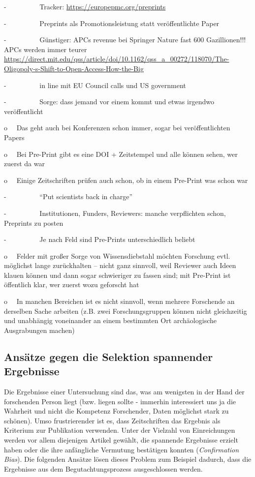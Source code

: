 \documentclass[
  letterpaper,
  DIV=11,
  numbers=noendperiod]{scrreprt}
\begin{document}
-~~~~~~~~~ Tracker: \url{https://europepmc.org/preprints}

-~~~~~~~~~ Preprints als Promotionsleistung statt veröffentlichte Paper

-~~~~~~~~~ Günstiger: APCs revenue bei Springer Nature fast 600
Gazillionen!!! APCs werden immer teurer
\url{https://direct.mit.edu/qss/article/doi/10.1162/qss_a_00272/118070/The-Oligopoly-s-Shift-to-Open-Access-How-the-Big}

-~~~~~~~~~ in line mit EU Council calls und US government

-~~~~~~~~~ Sorge: dass jemand vor einem kommt und etwas irgendwo
veröffentlicht

o~~ Das geht auch bei Konferenzen schon immer, sogar bei
veröffentlichten Papers

o~~ Bei Pre-Print gibt es eine DOI + Zeitstempel und alle können sehen,
wer zuerst da war

o~~ Einige Zeitschriften prüfen auch schon, ob in einem Pre-Print was
schon war

-~~~~~~~~~ ``Put scientists back in charge''

-~~~~~~~~~ Institutionen, Funders, Reviewers: manche verpflichten schon,
Preprints zu posten

-~~~~~~~~~ Je nach Feld sind Pre-Prints unterschiedlich beliebt

o~~ Felder mit großer Sorge von Wissensdiebstahl möchten Forschung evtl.
möglichst lange zurückhalten -- nicht ganz sinnvoll, weil Reviewer auch
Ideen klauen können und dann sogar schwieriger zu fassen sind; mit
Pre-Print ist öffentlich klar, wer zuerst wozu geforscht hat

o~~ In manchen Bereichen ist es nicht sinnvoll, wenn mehrere Forschende
an derselben Sache arbeiten (z.B. zwei Forschungsgruppen können nicht
gleichzeitig und unabhängig voneinander an einem bestimmten Ort
archäologische Ausgrabungen machen)

\subsection{Ansätze gegen die Selektion spannender
Ergebnisse}\label{ansuxe4tze-gegen-die-selektion-spannender-ergebnisse}

Die Ergebnisse einer Untersuchung sind das, was am wenigsten in der Hand
der forschenden Person liegt (bzw. liegen sollte - immerhin interessiert
uns ja die Wahrheit und nicht die Kompetenz Forschender, Daten möglichst
stark zu schönen). Umso frustrierender ist es, dass Zeitschriften das
Ergebnis als Kriterium zur Publikation verwenden. Unter der Vielzahl von
Einreichungen werden vor allem diejenigen Artikel gewählt, die spannende
Ergebnisse erzielt haben oder die ihre anfängliche Vermutung bestätigen
konnten (\emph{Confirmation Bias}). Die folgenden Ansätze lösen dieses
Problem zum Beispiel dadurch, dass die Ergebnisse aus dem
Begutachtungsprozess ausgeschlossen werden.
\end{document}
